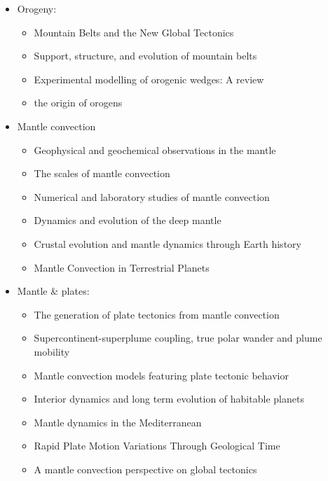 \begin{itemize}
\item Orogeny:
   \begin{itemize}
   \item [\nineteenseventy] Mountain Belts and the New Global Tectonics  \cite{debi70}
   \item [\nineteeneightyeight] Support, structure, and evolution of mountain belts \cite{moly88}
   \item [\twothousandtwelve] Experimental modelling of orogenic wedges: A review \cite{grmd12} 
   \item [\twothousandthirteen] the origin of orogens \cite{jabe13}
   \end{itemize}

\item Mantle convection 

   \begin{itemize}
   \item [\nineteenninetytwo] Geophysical and geochemical observations in the mantle \cite{dari92}
   \item [\nineteenninetyeight] The scales of mantle convection \cite{ande98}
   \item [\twothousandfive] Numerical and laboratory studies of mantle convection \cite{taxn05}
   \item [\twothousandtwelve] Dynamics and evolution of the deep mantle  \cite{tack12}
   \item [\twothousandeighteen] Crustal evolution and mantle dynamics through Earth history \cite{kore18}
   \item [\twothousandtwenty] Mantle Convection in Terrestrial Planets \cite{mube20}
   \end{itemize}

\item Mantle \& plates:
   \begin{itemize}
   \item [\twothousandthree] The generation of plate tectonics from mantle convection \cite{berc03}
   \item [\twothousandnine] Supercontinent-superplume coupling, true polar wander and plume mobility \cite{lizh09}
   \item [\twothousandeleven] Mantle convection models featuring plate tectonic behavior \cite{lowm11}
   \item [\twothousandtwelve] Interior dynamics and long term evolution of habitable planets \cite{taab12}
   \item [\twothousandfourteen] Mantle dynamics in the Mediterranean \cite{faba14}
   \item [\twothousandfifteen] Rapid Plate Motion Variations Through Geological Time \cite{iabu15}
   \item [\twothousandseventeen] A mantle convection perspective on global tectonics \cite{cogu17}
   \end{itemize}


\end{itemize}
